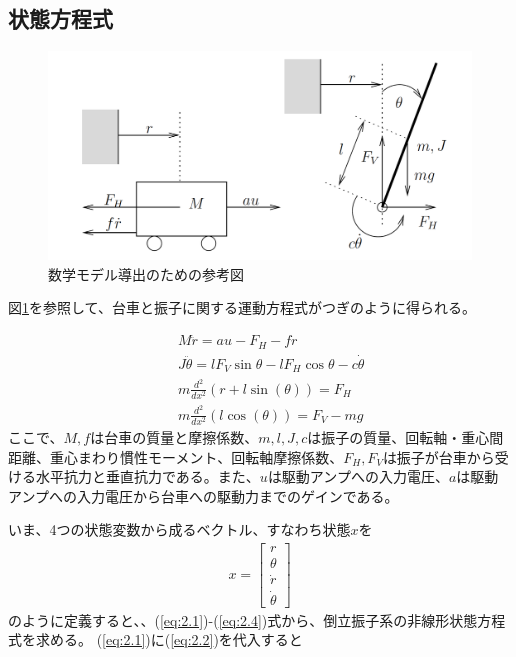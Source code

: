\documentclass[a4j,11pt,twoside]{ujbook}
\begin{document}
\subsection{状態方程式}
\begin{figure}[htbp]
	\begin{center}
		\includegraphics[width = 0.6 \linewidth]{modeling.png}
		\caption{数学モデル導出のための参考図}
		\label{fig:数式モデル導出のための参考図}
	\end{center}
\end{figure}

図\ref{fig:数式モデル導出のための参考図}を参照して、台車と振子に関する運動方程式がつぎのように得られる。

\begin{eqnarray}
&&M \ddot{r} = au - F_H - f \dot{r}
\label{eq:2.1}\\
&&J \ddot{\theta} = lF_V\sin{\theta} - lF_H\cos{\theta} - c\dot{\theta}
\label{eq:2.2}\\
&&m \frac{d^2}{dx^2} (r + l\sin(\theta))  =  F_H
\label{eq:2.3}\\
&&m \frac{d^2}{dx^2} (l\cos(\theta))  =  F_V - mg
\label{eq:2.4}
\end{eqnarray}
ここで、$M,f$は台車の質量と摩擦係数、$m,l,J,c$は振子の質量、回転軸・重心間距離、重心まわり慣性モーメント、回転軸摩擦係数、$F_H,F_V$は振子が台車から受ける水平抗力と垂直抗力である。また、$u$は駆動アンプへの入力電圧、$a$は駆動アンプへの入力電圧から台車への駆動力までのゲインである。

いま、4つの状態変数から成るベクトル、すなわち状態$x$を
\begin{eqnarray}
	x=\left[
	\begin{array}{c}
		r\\
		\theta\\
		\dot{r}\\
		\dot{\theta}
	\end{array}
	\right]
\end{eqnarray}
のように定義すると、、(\ref{eq:2.1})-(\ref{eq:2.4})式から、倒立振子系の非線形状態方程式を求める。
(\ref{eq:2.1})に(\ref{eq:2.2})を代入すると
\end{document}
